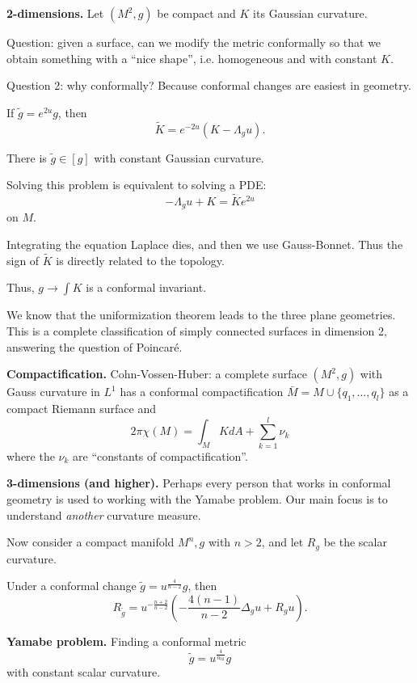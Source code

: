 \medskip\noindent
{\bf 2-dimensions.}
Let $(M^2,g)$ be compact and $K$ its
Gaussian curvature.

\noindent
Question: given a surface, can we modify the
metric conformally 
so that we obtain something with a
``nice shape'', i.e. homogeneous and with
constant $K$.

\noindent
Question 2: why conformally? Because
conformal changes are easiest in geometry.

If $\tilde{g}=e^{2u}g$, then
$$
\tilde{K}=e^{-2u}(K-\Lambda_gu).
$$

\begin{theorem}[Uniformization]
\label{theorem-uniformization-conformal}
There is $\tilde{g} \in [g]$
with constant Gaussian curvature.
\end{theorem}

\noindent
Solving this problem is equivalent to
solving a PDE:
$$
-\Lambda_g u + K
=
\tilde{K} e^{2u}
$$
on $M$.

Integrating the equation Laplace dies,
and then we use Gauss-Bonnet. Thus the sign
of $\tilde{K}$ is directly related to the
topology.

Thus,
$g \to \int K$ is a conformal invariant.

We know that the uniformization theorem
leads to the three plane geometries.
This is a complete classification of simply
connected surfaces in dimension 2,
answering the question of Poincaré.

\medskip\noindent
{\bf Compactification.}
Cohn-Vossen-Huber: a complete surface
$(M^2,g)$ with Gauss curvature in $L^1$ has
a conformal compactification $\bar{M} = 
M \cup  \{ q_1,…,q_l\}$ as a compact Riemann
surface and
$$
2\pi\chi(M)
=
\int_M K dA + \sum_{k=1}^l\nu_k
$$
where the $\nu_k$ are ``constants of
compactification''.


\medskip\noindent
{\bf 3-dimensions (and higher).}
Perhaps every person that works in conformal
geometry is used to working with the Yamabe
problem. Our main focus is to understand
{\it another} curvature measure.

Now consider a compact manifold $M^n,g$ with
$n>2$, and let $R_g$ be the scalar
curvature.

Under a conformal change
$\tilde{g} = u^{\frac{4}{n-2}}g$, then
$$
R_{\tilde{g}}=
u^{-\frac{n+2}{n-2}}\left(-\frac{4(n-1)}{n-2}\Delta_g
u + R_g u\right).
$$

{\bf Yamabe problem.} Finding a conformal
metric
$$
\tilde{g} = u^{\frac{4}{n_02}}g
$$
with constant scalar curvature.

